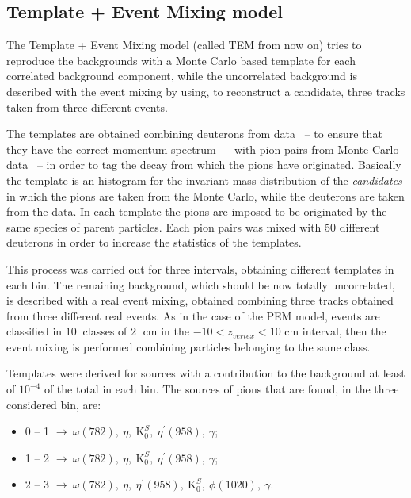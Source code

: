 %
\subsection{Template + Event Mixing model} \label{sec:tem}

The Template + Event Mixing model (called TEM from now on) tries to reproduce the backgrounds with a Monte Carlo
based template for each correlated background component, while the uncorrelated background is described 
with the event mixing by using, to reconstruct a \ds candidate, three tracks taken from three different events.


The templates are obtained combining deuterons from data \ -- to ensure that they have the correct
momentum spectrum -- \ with pion pairs from Monte Carlo data \ -- in order to tag the decay from which
the pions have originated.
Basically the template is an histogram for the invariant mass distribution of the \textit{\ds candidates} 
in which the pions are taken from the Monte Carlo, while the deuterons are taken from the data.
In each template the pions are imposed to be originated by the same species of parent particles.
Each pion pairs was mixed with 50 different deuterons in order to increase the statistics of the templates.

This process was carried out for three \pt intervals, obtaining different templates in 
each \pt bin.
The remaining background, which should be now totally uncorrelated, is described with a real event 
mixing, obtained combining three tracks obtained from three different real events.
As in the case of the PEM model, events are classified in $10\ $ classes of $2\;$ cm in the 
$-10 < z_{vertex} < 10$ cm interval, then the event mixing is performed combining particles belonging
to the same class.

Templates were derived for sources with a contribution to the background at least of $10^{-4}$ of
the total in each \pt bin. 
The sources of pions that are found, in the three considered \pt bin, are:
\begin{itemize}
  \item[] 0 -- 1 \gevc $\rightarrow \ \omega(782),\ \eta,\ \mathrm K_{0}^{S},\ \eta^{'}(958),\ \gamma $;
  \item[] 1 -- 2 \gevc $\rightarrow \ \omega(782),\ \eta,\ \mathrm K_{0}^{S},\ \eta^{'}(958),\ \gamma $;
  \item[] 2 -- 3 \gevc $\rightarrow \ \omega(782),\ \eta,\ \eta^{'}(958),\ \mathrm K_{0}^{S},\ \phi(1020),\ \gamma $.
\end{itemize}

